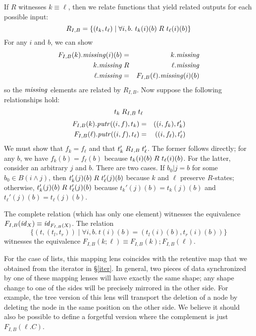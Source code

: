 \begin{defn}[$R$-similarity]
\begin{theorem}
\begin{lemma}
\begin{theorem}[No products]
\begin{lemma}
\begin{defn}
\begin{theorem}
\begin{theorem}
\begin{corollary}[Hylomorphism]
\begin{defn}
\begin{defn}
\begin{lenseqv}
If $R$ witnesses $k \equiv \ell$, then we relate functions that yield
related outputs for each possible input:
\[R_{I,B} = \{(t_k,t_\ell) \mid \forall i,b.\ t_k(i)(b) \mathrel{R_{}} t_\ell(i)(b)\}\]
For any $i$ and $b$, we can show
\begin{eqnarray*}
F_{I,B}(k).\mathit{missing}(i)(b) &=& k.\mathit{missing} \\
k.\mathit{missing} &\mathrel{R_{}}& \ell.\mathit{missing} \\
\ell.\mathit{missing} &=& F_{I,B}(\ell).\mathit{missing}(i)(b)
\end{eqnarray*}
so the $\mathit{missing}$ elements are related by $R_{I,B}$. Now suppose the
following relationships hold:
\[t_k \mathrel{R_{I,B}} t_\ell\]
\vspace{-4ex} %
\begin{eqnarray*}
    F_{I,B}(k).\mathit{putr}((i,f),t_k) &=& ((i,f_k),t_k') \\
    F_{I,B}(\ell).\mathit{putr}((i,f),t_\ell) &=& ((i,f_\ell),t_\ell')
\end{eqnarray*}
We must show that $f_k = f_\ell$ and that $t_k'\mathrel{R_{I,B}}t_\ell'$.
The former follows directly; for any $b$, we have $f_k(b)=f_\ell(b)$ because
$t_k(i)(b) \mathrel{R_{}} t_\ell(i)(b)$. For the latter, consider an arbitrary $j$
and $b$. There are two cases. If $b_0|j = b$ for some $b_0 \in B(i \wedge
j)$, then $t_k'(j)(b) \mathrel{R_{}} t_\ell'(j)(b)$ because $k$ and $\ell$ preserve
$R$-states; otherwise, $t_k'(j)(b) \mathrel{R_{}} t_\ell'(j)(b)$ because
$t_k'(j)(b)=t_k(j)(b)$ and $t_\ell'(j)(b)=t_\ell(j)(b)$.
\end{lenseqv}

\begin{functoriality}
The complete relation (which has only one element) witnesses the equivalence
$F_{I,B}(\mathit{id}_X)\equiv\mathit{id}_{F_{I,B}(X)}$. The relation
\[\{(t,(t_l,t_r))\mid\forall i,b.\ t(i)(b)=(t_l(i)(b),t_r(i)(b))\}\]
witnesses the equivalence $F_{I,B}(k;\ell) \equiv F_{I,B}(k);F_{I,B}(\ell)$.
\end{functoriality}
\fi

For the case of lists, this mapping lens coincides with the retentive map
that we obtained from the iterator in \S\ref{iter}.
%
In general, two pieces of data synchronized by one of these mapping lenses
will have exactly the same shape; any shape change to one of the sides will
be precisely mirrored in the other side.
%
For example, the tree version of this lens will transport the deletion of a
node by deleting the node in the same position on the other side.
%
We believe it should also be possible to define a forgetful version where the
complement is just $F_{I,B}(\ell.C)$.


\end{defn}
\end{defn}
\end{corollary}
\end{theorem}
\end{theorem}
\end{defn}
\end{lemma}
\end{theorem}
\end{lemma}
\end{theorem}
\end{defn}
